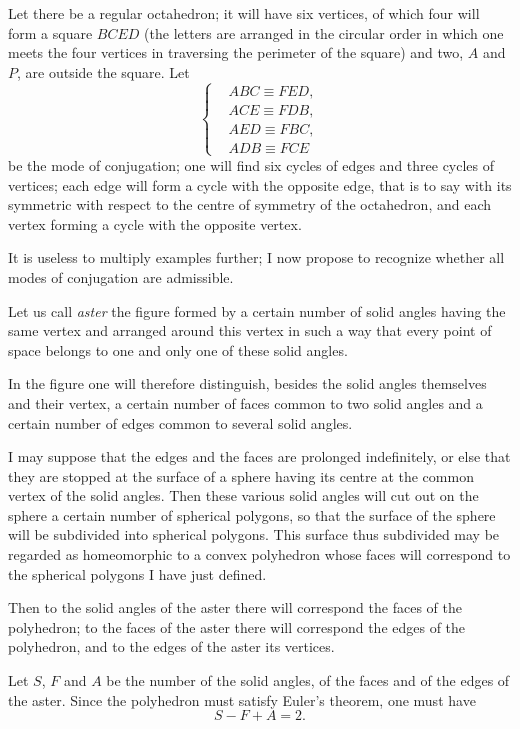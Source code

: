 \documentclass{article}
\begin{document}
Let there be a regular octahedron; it will have six vertices, of which four will form a square $BCED$ (the letters are arranged in the circular order in which one meets the four vertices in traversing the perimeter of the square) and two, $A$ and $P$, are outside the square. Let
\[ \left\{ \begin{aligned} &ABC \equiv FED,\\ &ACE \equiv FDB,\\ &AED \equiv FBC,\\ &ADB \equiv FCE \end{aligned} \right. \tag{6} \]
be the mode of conjugation; one will find six cycles of edges and three cycles of vertices; each edge will form a cycle with the opposite edge, that is to say with its symmetric with respect to the centre of symmetry of the octahedron, and each vertex forming a cycle with the opposite vertex.

It is useless to multiply examples further; I now propose to recognize whether all modes of conjugation are admissible.

Let us call \emph{aster} the figure formed by a certain number of solid angles having the same vertex and arranged around this vertex in such a way that every point of space belongs to one and only one of these solid angles.

In the figure one will therefore distinguish, besides the solid angles themselves and their vertex, a certain number of faces common to two solid angles and a certain number of edges common to several solid angles.

I may suppose that the edges and the faces are prolonged indefinitely, or else that they are stopped at the surface of a sphere having its centre at the common vertex of the solid angles. Then these various solid angles will cut out on the sphere a certain number of spherical polygons, so that the surface of the sphere will be subdivided into spherical polygons. This surface thus subdivided may be regarded as homeomorphic to a convex polyhedron whose faces will correspond to the spherical polygons I have just defined.

Then to the solid angles of the aster there will correspond the faces of the polyhedron; to the faces of the aster there will correspond the edges of the polyhedron, and to the edges of the aster its vertices.

Let $S$, $F$ and $A$ be the number of the solid angles, of the faces and of the edges of the aster. Since the polyhedron must satisfy Euler's theorem, one must have
\[ S - F + A = 2. \]
\end{document}
